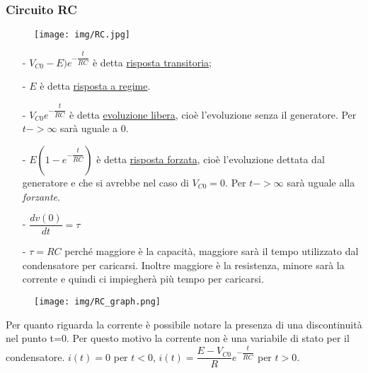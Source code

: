 \documentclass{article}
\begin{document}
\pagebreak

\subsubsection{Circuito RC}
\medskip
\noindent{}
\medskip

\begin{figure}[h!]
    \begin{center}
        \texttt{[image: img/RC.jpg]}
    \end{center}
\end{figure}

\begin{itemize}
    \item[-] $V_{C0}-E)e^{-\dfrac{t}{RC}}$ è detta \underline{risposta transitoria};
    \item[-] $E$ è detta \underline{risposta a regime}.
    \item[-] $V_{C0}e^{-\dfrac{t}{RC}}$ è detta \underline{evoluzione libera}, cioè l'evoluzione senza il generatore. Per $t->\infty$ sarà uguale a 0.
    \item[-] $E(1-e^{-\dfrac{t}{RC}})$ è detta \underline{risposta forzata}, cioè l'evoluzione dettata dal generatore e che si avrebbe
    nel caso di $V_{C0}=0$. Per $t->\infty$ sarà uguale alla \textit{forzante}.
    \item[-] $\dfrac{d v(0)}{d t}=\tau$
    \item[-] $\tau=RC$ perché maggiore è la capacità, maggiore sarà il tempo utilizzato dal condensatore per caricarsi. Inoltre maggiore 
    è la resistenza, minore sarà la corrente e quindi ci impiegherà più tempo per caricarsi.
\end{itemize}


\begin{figure}[h!]
    \begin{center}
        \texttt{[image: img/RC\_graph.png]}
    \end{center}
\end{figure}

\noindent Per quanto riguarda la corrente è possibile notare la presenza di una discontinuità nel punto t=0. Per questo motivo la corrente non è
una variabile di stato per il condensatore. $i(t)=0$ per $t<0$, $i(t)=\dfrac{E-V_{C0}}{R}e^{-\dfrac{t}{RC}}$ per $t>0$.
\pagebreak
\end{document}

